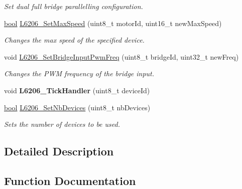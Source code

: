 \begin{DoxyCompactItemize}
\begin{DoxyCompactList}\small\item\em Set dual full bridge parallelling configuration. \end{DoxyCompactList}\item 
\mbox{\hyperlink{group___motor___boolean___type_ga0ecf26b576b9a54eca656b9be7ba6a06}{bool}} \mbox{\hyperlink{group___l6206___exported___functions_gada5e46e0ed715e962205f1d65aa11370}{L6206\+\_\+\+Set\+Max\+Speed}} (uint8\+\_\+t motor\+Id, uint16\+\_\+t new\+Max\+Speed)
\begin{DoxyCompactList}\small\item\em Changes the max speed of the specified device. \end{DoxyCompactList}\item 
void \mbox{\hyperlink{group___l6206___exported___functions_gac4b755ed3297f186b27030c5108fc0fd}{L6206\+\_\+\+Set\+Bridge\+Input\+Pwm\+Freq}} (uint8\+\_\+t bridge\+Id, uint32\+\_\+t new\+Freq)
\begin{DoxyCompactList}\small\item\em Changes the P\+WM frequency of the bridge input. \end{DoxyCompactList}\item 
\mbox{\label{group___l6206___exported___functions_gaee1040a2e270f617cb5c91e936f8d6e6}} 
void {\bfseries L6206\+\_\+\+Tick\+Handler} (uint8\+\_\+t device\+Id)
\item 
\mbox{\hyperlink{group___motor___boolean___type_ga0ecf26b576b9a54eca656b9be7ba6a06}{bool}} \mbox{\hyperlink{group___l6206___exported___functions_gaa25442be9b6a3d12b3c3b28568350528}{L6206\+\_\+\+Set\+Nb\+Devices}} (uint8\+\_\+t nb\+Devices)
\begin{DoxyCompactList}\small\item\em Sets the number of devices to be used. \end{DoxyCompactList}\end{DoxyCompactItemize}


\subsection{Detailed Description}


\subsection{Function Documentation}
\mbox{\label{group___l6206___exported___functions_ga297db3a8467d60c474207228f8db4239}} 

